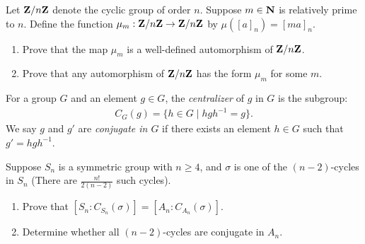 \documentclass[11pt,twoside,openany]{memoir}
\begin{document}
    \begin{exercise}
        Let $\mathbf{Z}/n\mathbf{Z}$ denote the cyclic group of order $n$. Suppose $m \in \mathbf{N}$ is relatively prime to $n$. Define the function $\mu_m:\mathbf{Z}/n\mathbf{Z} \rightarrow \mathbf{Z}/n\mathbf{Z}$ by $\mu([a]_n) = [ma]_n$.
        \begin{enumerate}[label = (\arabic*),itemsep=1pt,topsep=3pt]
            \item Prove that the map $\mu_m$ is a well-defined automorphism of $\mathbf{Z}/n\mathbf{Z}$.
            \item Prove that any automorphism of $\mathbf{Z}/n\mathbf{Z}$ has the form $\mu_m$ for some $m$.
        \end{enumerate}
    \end{exercise}

    \begin{exercise}
        For a group $G$ and an element $g \in G$, the \textit{centralizer} of $g$ in $G$ is the subgroup:
            \begin{equation*}
            \begin{split}
                C_G(g) = \{h \in G \mid hgh^{-1} = g\}.
            \end{split}
            \end{equation*}
        We say $g$ and $g'$ are \textit{conjugate in $G$} if there exists an element $h \in G$ such that $g' = hgh^{-1}$.

        Suppose $S_n$ is a symmetric group with $n \geq 4$, and $\sigma$ is one of the $(n-2)$-cycles in $S_n$ (There are $\frac{n!}{2(n-2)}$ such cycles). 
            \begin{enumerate}[label = (\roman*),itemsep=1pt,topsep=3pt]
                \item Prove that $[S_n : C_{S_n}(\sigma)] = [A_n:C_{A_n}(\sigma)]$.
                \item Determine whether all $(n-2)$-cycles are conjugate in $A_n$.
            \end{enumerate}
    \end{exercise}
\end{document}
